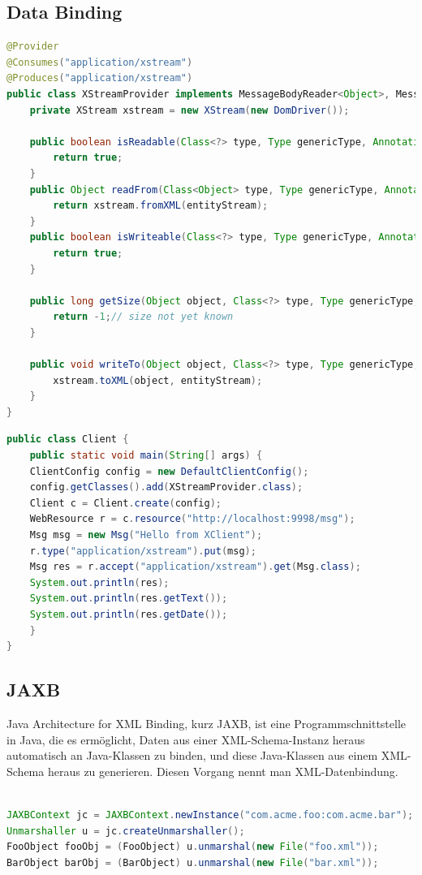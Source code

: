 \documentclass[10pt]{article}
\begin{document}
\subsection{Data Binding}
\begin{lstlisting}[language=Java, caption=XStream Provider, style=JavaStyle]
@Provider
@Consumes("application/xstream")
@Produces("application/xstream")
public class XStreamProvider implements MessageBodyReader<Object>, MessageBodyWriter<Object>{
	private XStream xstream = new XStream(new DomDriver());
	
	public boolean isReadable(Class<?> type, Type genericType, Annotation[] annotations, MediaType mimeType) {
		return true;
	}
	public Object readFrom(Class<Object> type, Type genericType, Annotation[] annotations, MediaType mimeType, MultivaluedMap<String, String> httpHeaders, InputStream entityStream) {
		return xstream.fromXML(entityStream);
	}
	public boolean isWriteable(Class<?> type, Type genericType, Annotation[] ann, MediaType mimeType) {
		return true;
	}
	
	public long getSize(Object object, Class<?> type, Type genericType, Annotation[] ann, MediaType mimeType) {
		return -1;// size not yet known
	}
	
	public void writeTo(Object object, Class<?> type, Type genericType, Annotation[] ann, MediaType mimeType, MultivaluedMap<String, Object> httpHeaders, OutputStream entityStream) {
		xstream.toXML(object, entityStream);
	}
}
\end{lstlisting}
\begin{lstlisting}[language=Java, caption=XStream Example, style=JavaStyle]
public class Client {
	public static void main(String[] args) {
	ClientConfig config = new DefaultClientConfig();
	config.getClasses().add(XStreamProvider.class);
	Client c = Client.create(config);
	WebResource r = c.resource("http://localhost:9998/msg");
	Msg msg = new Msg("Hello from XClient");
	r.type("application/xstream").put(msg);
	Msg res = r.accept("application/xstream").get(Msg.class); 
	System.out.println(res);
	System.out.println(res.getText());
	System.out.println(res.getDate());
	}
}
\end{lstlisting}
\subsection{JAXB}
Java Architecture for XML Binding, kurz JAXB, ist eine Programmschnittstelle in Java, die es ermöglicht, Daten aus einer XML-Schema-Instanz heraus automatisch an Java-Klassen zu binden, und diese Java-Klassen aus einem XML-Schema heraus zu generieren. Diesen Vorgang nennt man XML-Datenbindung.
\begin{lstlisting}[language=Java, caption=Unmarshalling, style=JavaStyle]

JAXBContext jc = JAXBContext.newInstance("com.acme.foo:com.acme.bar");
Unmarshaller u = jc.createUnmarshaller();
FooObject fooObj = (FooObject) u.unmarshal(new File("foo.xml"));
BarObject barObj = (BarObject) u.unmarshal(new File("bar.xml"));
\end{lstlisting}
\end{document}
